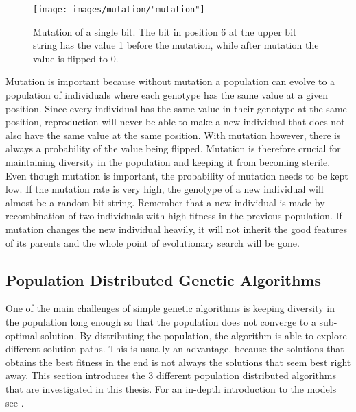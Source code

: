 \begin{figure}[h!]
\begin{center}
\texttt{[image: images/mutation/"mutation"]}
\caption{Mutation of a single bit. The bit in position 6 at the upper bit string has the value 1 before the mutation, while after mutation the value is flipped to 0.}
\label{Mutation}
\end{center}
\end{figure}


\noindent Mutation is important because without mutation a population can evolve to a population of individuals where each genotype has the same value at a given position. Since every individual has the same value in their genotype at the same position, reproduction will never be able to make a new individual that does not also have the same value at the same position. With mutation however, there is always a probability of the value being flipped. Mutation is therefore crucial for maintaining diversity in the population and keeping it from becoming sterile.\\


\noindent Even though mutation is important, the probability of mutation needs to be kept low. If the mutation rate is very high, the genotype of a new individual will almost be a random bit string. Remember that a new individual is made by recombination of two individuals with high fitness in the previous population. If mutation changes the new individual heavily, it will not inherit the good features of its parents and the whole point of evolutionary search will be gone.\\


\subsection{Population Distributed Genetic Algorithms}\label{subsection:dga}
One of the main challenges of simple genetic algorithms is keeping diversity in the population long enough so that the population does not converge to a sub-optimal solution. By distributing the population, the algorithm is able to explore different solution paths. This is usually an advantage, because the solutions that obtains the best fitness in the end is not always the solutions that seem best right away. This section introduces the 3 different population distributed algorithms that are investigated in this thesis. For an in-depth introduction to the models see \citep{Gong}.\\


